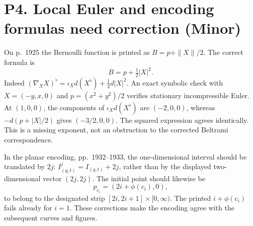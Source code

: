 \documentclass[10pt]{article}
\begin{document}
\section*{P4. Local Euler and encoding formulas need correction (Minor)}
On p. 1925 the Bernoulli function is printed as \(B=p+\|X\|/2\). The correct formula is \[B=p+\tfrac12|X|^2.\] Indeed \((\nabla_X X)^\flat=\iota_Xd(X^\flat)+\tfrac12d|X|^2\). An exact symbolic check with \(X=(-y,x,0)\) and \(p=(x^2+y^2)/2\) verifies stationary incompressible Euler. At \((1,0,0)\), the components of \(\iota_Xd(X^\flat)\) are \((-2,0,0)\), whereas \(-d(p+|X|/2)\) gives \((-3/2,0,0)\). The squared expression agrees identically. This is a missing exponent, not an obstruction to the corrected Beltrami correspondence.\par
In the planar encoding, pp. 1932–1933, the one-dimensional interval should be translated by \(2j\): \(I_{(q,t)}^j=I_{(q,t)}+2j\), rather than by the displayed two-dimensional vector \((2j,2j)\). The initial point should likewise be \[p_{c_i}=(2i+\phi(c_i),0),\] to belong to the designated strip \([2i,2i+1]\times[0,\infty)\). The printed \(i+\phi(c_i)\) fails already for \(i=1\). These corrections make the encoding agree with the subsequent curves and figures.\par
\end{document}
